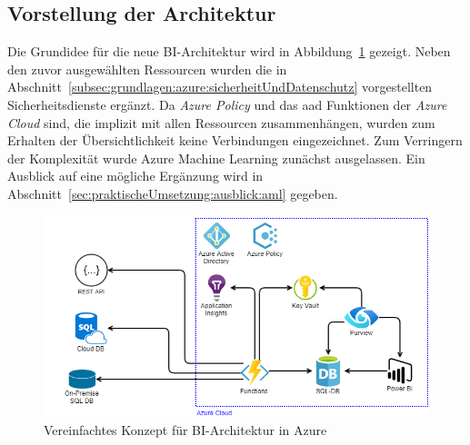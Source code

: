 \subsection{Vorstellung der Architektur}
Die Grundidee für die neue BI-Architektur wird in Abbildung~\ref{fig:chap03_4_konzeptArchitektur_offen} gezeigt. Neben den zuvor ausgewählten Ressourcen wurden die in Abschnitt~\ref{subsec:grundlagen:azure:sicherheitUndDatenschutz} vorgestellten Sicherheitsdienste ergänzt. Da \textit{Azure Policy} und das \ac{aad} Funktionen der \textit{Azure Cloud} sind, die implizit mit allen Ressourcen zusammenhängen, wurden zum Erhalten der Übersichtlichkeit keine Verbindungen eingezeichnet. Zum Verringern der Komplexität wurde Azure Machine Learning zunächst ausgelassen. Ein Ausblick auf eine mögliche Ergänzung wird in Abschnitt~\ref{sec:praktischeUmsetzung:ausblick:aml} gegeben.

\begin{figure}[htbp]
 \centering
 \includegraphics[width=\textwidth]{gfx/konzept_1.png}
 \caption{Vereinfachtes Konzept für BI-Architektur in Azure}
\label{fig:chap03_4_konzeptArchitektur_offen}
\end{figure}

